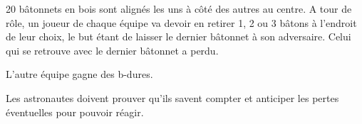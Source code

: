 \documentclass{grand-jeu}
\begin{document}
\begin{liste-materiel}
\end{liste-materiel}

\begin{regles}
20 bâtonnets en bois sont alignés les uns à côté des autres au centre. A tour de rôle, un joueur de chaque équipe va devoir en retirer 1, 2 ou 3 bâtons à l'endroit de leur choix, le but étant de laisser le dernier bâtonnet à son adversaire. Celui qui se retrouve avec le dernier bâtonnet a perdu.

L'autre équipe gagne des b-dures. 
\end{regles}

\begin{imaginaire}
Les astronautes doivent prouver qu'ils savent compter et anticiper les pertes éventuelles pour pouvoir réagir.
\end{imaginaire}

\begin{moments-stop}
\end{moments-stop}
\end{document}

